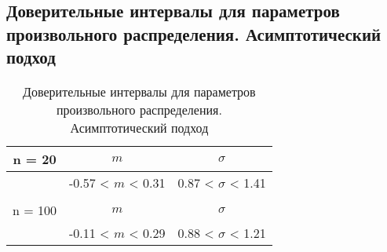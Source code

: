 \documentclass[../main.tex]{subfiles}
\begin{document}
\subsection{Доверительные интервалы для параметров произвольного распределения. Асимптотический подход}
	\begin{table}[H]
	    \centering
	    \begin{tabular}{| c | c | c |}
	    \hline
	       n = 20   &  $m$  & $\sigma$\\ \hline
	          &  -0.57 < $m$ < 0.31 & 0.87 < $\sigma$ < 1.41 \\ \hline
	         &   &   \\ \hline
	       n = 100   &  $m$  & $\sigma$\\ \hline
	        & -0.11 < $m$ < 0.29 & 0.88 < $\sigma$ < 1.21 \\
	   \hline
	    \end{tabular}
	    \caption{Доверительные интервалы для параметров произвольного распределения. Асимптотический подход}
	    \label{tab:interv_asimpt}
	\end{table}
\end{document}
